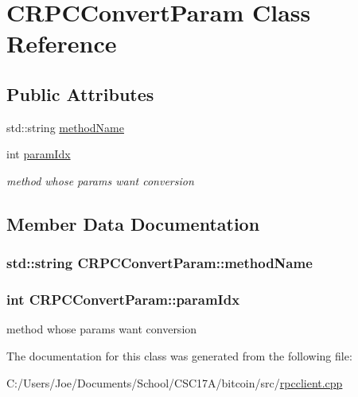 \hypertarget{class_c_r_p_c_convert_param}{}\section{C\+R\+P\+C\+Convert\+Param Class Reference}
\label{class_c_r_p_c_convert_param}
\subsection*{Public Attributes}
\begin{DoxyCompactItemize}
\item 
std\+::string \hyperlink{class_c_r_p_c_convert_param_a072d6cde94ea57223445dee927ee1527}{method\+Name}
\item 
int \hyperlink{class_c_r_p_c_convert_param_a3bd464f8d5db060616e7be8fbacb58f8}{param\+Idx}
\begin{DoxyCompactList}\small\item\em method whose params want conversion \end{DoxyCompactList}\end{DoxyCompactItemize}


\subsection{Member Data Documentation}
\hypertarget{class_c_r_p_c_convert_param_a072d6cde94ea57223445dee927ee1527}{}
\subsubsection[{method\+Name}]{\setlength{\rightskip}{0pt plus 5cm}std\+::string C\+R\+P\+C\+Convert\+Param\+::method\+Name}\label{class_c_r_p_c_convert_param_a072d6cde94ea57223445dee927ee1527}
\hypertarget{class_c_r_p_c_convert_param_a3bd464f8d5db060616e7be8fbacb58f8}{}
\subsubsection[{param\+Idx}]{\setlength{\rightskip}{0pt plus 5cm}int C\+R\+P\+C\+Convert\+Param\+::param\+Idx}\label{class_c_r_p_c_convert_param_a3bd464f8d5db060616e7be8fbacb58f8}


method whose params want conversion 



The documentation for this class was generated from the following file\+:\begin{DoxyCompactItemize}
\item 
C\+:/\+Users/\+Joe/\+Documents/\+School/\+C\+S\+C17\+A/bitcoin/src/\hyperlink{rpcclient_8cpp}{rpcclient.\+cpp}\end{DoxyCompactItemize}
